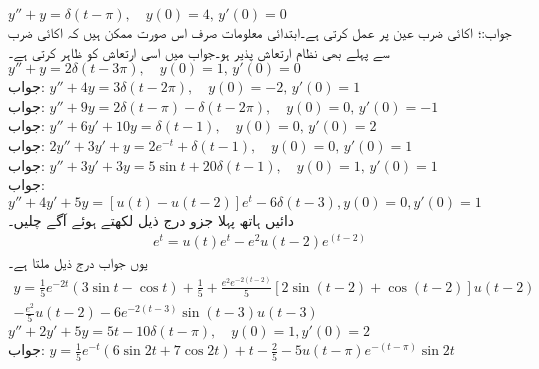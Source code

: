 \quad
$y''+y=\delta(t-\pi),\quad y(0)=4, \, y'(0)=0$\\
جواب:؛ اکائی ضرب عین  پر عمل کرتی ہے۔ابتدائی معلومات صرف اس صورت ممکن ہیں کہ اکائی ضرب سے پہلے بھی نظام ارتعاش پذیر ہو۔جواب میں  اسی ارتعاش کو ظاہر کرتی ہے۔ 
\quad
$y''+y=2\delta(t-3\pi),\quad y(0)=1, \, y'(0)=0$\\
جواب:
\quad
$y''+4y=3\delta(t-2\pi),\quad y(0)=-2, \, y'(0)=1$\\
جواب:
\quad
$y''+9y=2\delta(t-\pi)-\delta(t-2\pi),\quad y(0)=0, \, y'(0)=-1$\\
جواب:
\quad
$y''+6y'+10y=\delta(t-1), \quad y(0)=0,\, y'(0)=2$\\
جواب:
\quad
$2y''+3y'+y=2e^{-t}+\delta(t-1), \quad y(0)=0, \, y'(0)=1$\\
جواب:
\quad
$y''+3y'+3y=5\sin t+20\delta(t-1),\quad y(0)=1,\, y'(0)=1$\\
جواب:
\quad
$y''+4y'+5y=[u(t)-u(t-2)]e^t-6\delta(t-3), y(0)=0, y'(0)=1$\\
دائیں ہاتھ پہلا جزو درج ذیل لکھتے ہوئے آگے چلیں۔
\begin{align*}
[u(t)-u(t-2)]e^t=u(t)e^t-e^2u(t-2)e^{(t-2)}
\end{align*}
یوں جواب درج ذیل ملتا ہے۔
\begin{multline*}
y=\frac{1}{5}e^{-2t}(3\sin t-\cos t)+\frac{1}{5}+\frac{e^2e^{-2(t-2)}}{5}[2\sin(t-2)+\cos(t-2)]u(t-2)\\
-\frac{e^2}{5}u(t-2)-6e^{-2(t-3)}\sin(t-3)u(t-3)
\end{multline*}
\quad
$y''+2y'+5y=5t-10\delta(t-\pi),\quad y(0)=1, y'(0)=2$\\
جواب:
$y=\tfrac{1}{5}e^{-t}(6\sin 2t+7\cos 2t)+t-\tfrac{2}{5}-5u(t-\pi)e^{-(t-\pi)}\sin 2t$

